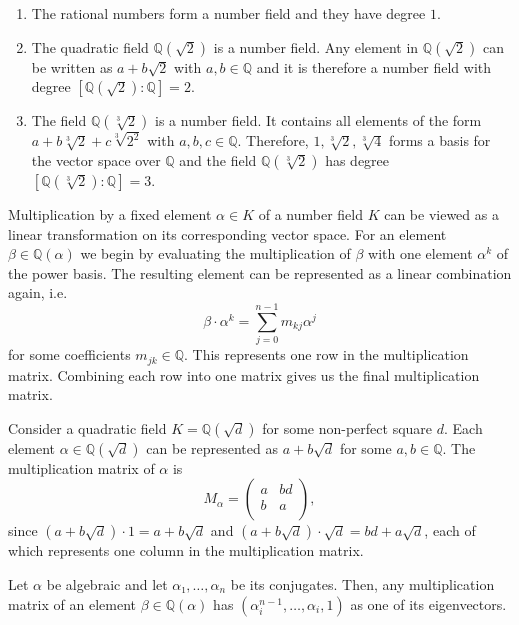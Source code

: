 \begin{example}
  \hfill
  \begin{enumerate}
    \item The rational numbers form a number field and they have degree $1$.
    \item The quadratic field $ℚ(\sqrt{2})$ is a number field.
      Any element in $ ℚ(\sqrt{2})$ can be written as $a + b \sqrt{2}$ with $a,b ∈ ℚ$
      and it is therefore a number field with degree $[ℚ(\sqrt{2}) : ℚ] = 2$.
    \item The field $ℚ(\sqrt[3]{2})$ is a number field.
      It contains all elements of the form $a + b \sqrt[3]{2} + c \sqrt[3]{2^2}$ with $a,b,c ∈ ℚ$.
      Therefore, $1, \sqrt[3]{{2}}, \sqrt[3]{4}$ forms a basis for the vector space over $ℚ$
      and the field $ℚ(\sqrt[3]{2})$ has degree $[ℚ(\sqrt[3]{2}) : ℚ] = 3$.
  \end{enumerate}
\end{example}

Multiplication by a fixed element $α ∈ K$ of a number field $K$ can be viewed
as a linear transformation on its corresponding vector space.
For an element $β ∈ ℚ(α)$ we begin by evaluating the
multiplication of $β$ with one element $α^k$ of the power basis.
The resulting element can be represented as a linear combination again,
i.e.
\[
  β · α^k = \sum_{j=0}^{n-1} m_{kj} α^j
\]
for some coefficients $m_{jk} ∈ ℚ$.
This represents one row in the multiplication matrix.
Combining each row into one matrix gives us the final multiplication matrix.

\begin{example}
  \label{ex:mult-matrix}
  Consider a quadratic field $K = ℚ(\sqrt{d})$ for some non-perfect square $d$.
  Each element $α ∈ ℚ(\sqrt{d})$ can be represented as $a + b \sqrt{d}$ for some $a, b ∈ ℚ$.
  The multiplication matrix of $α$ is
  \[
    M_α =
    \begin{pmatrix}
      a & bd \\
      b & a \\
    \end{pmatrix},
  \]
  since
  $(a + b \sqrt{d}) · 1 = a + b \sqrt{d}$ and
  $(a + b \sqrt{d}) · \sqrt{d} = bd + a \sqrt{d}$,
  each of which represents one column in the multiplication matrix.
\end{example}

\begin{lemma}
  Let $α$ be algebraic and let $α₁, …, α_n$ be its conjugates.
  Then, any multiplication matrix of an element $β ∈ ℚ(α)$ has $(α_i^{n-1}, …, α_i, 1)$ as one of its eigenvectors.
\end{lemma}

